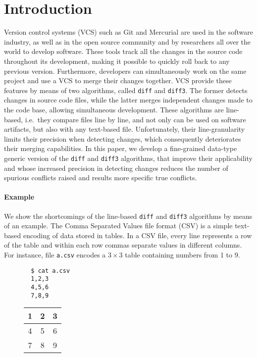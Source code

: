 \documentclass{sigplanconf}
\theoremstyle{plain}
\begin{document}
\section{Introduction}
\label{sec:intro}
Version control systems (VCS) such as Git \cite{Git} and Mercurial
\cite{Mercurial} are used in the software industry, as well as in the
open source community and by researchers all over the world to develop
software.  These tools track all the changes in the source code
throughout its development, making it possible to quickly roll back to
any previous version.
%
Furthermore, developers can simultaneously work on the same project and
use a VCS to merge their changes together.
%
VCS provide these features by means of two algorithms, called
\texttt{diff} and \texttt{diff3}.
%
The former detects changes in source code files, while the latter
merges independent changes made to the code base, allowing
simultaneous development.
%
These algorithms are line-based, i.e.\ they compare files line by
line, and not only can be used on software artifacts, but also with
any text-based file.
%
Unfortunately, their line-granularity limits their precision when
detecting changes, which consequently deteriorates their merging
capabilities.
%
In this paper, we develop a fine-grained data-type generic version of
the \texttt{diff} and \texttt{diff3} algorithms, that improve their
applicability and whose increased precision in detecting changes
reduces the number of spurious conflicts raised and results more
specific true conflicts.

\paragraph{Example}
We show the shortcomings of the line-based \texttt{diff} and
\texttt{diff3} algorithms by means of an example.  The Comma Separated
Values file format (CSV) is a simple text-based encoding of data
stored in tables. %
In a CSV file, every line represents a row of the table and within
each row commas separate values in different columns.  For instance,
file \texttt{a.csv} encodes a $3 \times 3$ table containing numbers
from 1 to 9.
\begin{figure}[!h]
\centering
\begin{minipage}{.15\textwidth}
{  \centering
  \begin{verbatim}
  $ cat a.csv
  1,2,3
  4,5,6
  7,8,9
  \end{verbatim}\par
}
\end{minipage}%
\begin{minipage}{.15\textwidth}
{  \centering
  \begin{tabular}{ | c | c | c | }
    \hline
    1 & 2 & 3 \\ \hline
    4 & 5 & 6 \\ \hline
    7 & 8 & 9  \\ \hline
  \end{tabular}\par
}
\end{minipage}%
\end{figure}
\end{document}
